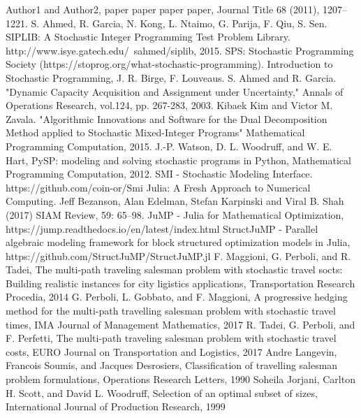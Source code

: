 \begin{thebibliography}{9} 
	Author1 and Author2, paper paper paper paper, Journal Title 68 (2011), 1207--1221.
	S. Ahmed, R. Garcia, N. Kong, L. Ntaimo, G. Parija, F. Qiu, S. Sen. SIPLIB: A Stochastic Integer Programming Test Problem Library. http://www.isye.gatech.edu/~sahmed/siplib, 2015.
	SPS: Stochastic Programming Society (https://stoprog.org/what-stochastic-programming).
	Introduction to Stochastic Programming, J. R. Birge, F. Louveaus.
	S. Ahmed and R. Garcia. "Dynamic Capacity Acquisition and Assignment under Uncertainty," Annals of Operations Research, vol.124, pp. 267-283, 2003.
	Kibaek Kim and Victor M. Zavala. "Algorithmic Innovations and Software for the Dual Decomposition Method applied to Stochastic Mixed-Integer Programs" Mathematical Programming Computation, 2015.
	J.-P. Watson, D. L. Woodruff, and W. E. Hart, PySP: modeling and solving stochastic programs in Python, Mathematical Programming Computation, 2012.
	SMI - Stochastic Modeling Interface. https://github.com/coin-or/Smi
	Julia: A Fresh Approach to Numerical Computing. Jeff Bezanson, Alan Edelman, Stefan Karpinski and Viral B. Shah (2017) SIAM Review, 59: 65–98.
	JuMP - Julia for Mathematical Optimization, https://jump.readthedocs.io/en/latest/index.html
	StructJuMP - Parallel algebraic modeling framework for block structured optimization models in Julia, https://github.com/StructJuMP/StructJuMP.jl
	F. Maggioni, G. Perboli, and R. Tadei, The multi-path traveling salesman problem with stochastic travel socts: Building realistic instances for city ligistics applications, Transportation Research Procedia, 2014
	G. Perboli, L. Gobbato, and F. Maggioni, A progressive hedging method for the multi-path travelling salesman problem with stochastic travel times, IMA Journal of Management Mathematics, 2017
	R. Tadei, G. Perboli, and F. Perfetti, The multi-path traveling salesman problem with stochastic travel costs, EURO Journal on Transportation and Logistics, 2017
	Andre Langevin, Francois Soumis, and Jacques Desrosiers, Classification of travelling salesman problem formulations, Operations Research Letters, 1990
	Soheila Jorjani, Carlton H. Scott, and David L. Woodruff, Selection of an optimal subset of sizes, International Journal of Production Research, 1999
\end{thebibliography}


